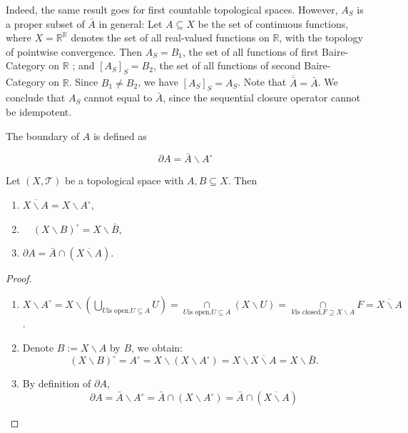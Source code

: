 Indeed, the same result goes for first countable topological spaces. However, \({A}_{S}\) is a proper subset of \(\bar{A}\) in general: Let \(A \subseteq  X\) be the set of continuous functions, where \(X = {\mathbb{R}}^{\mathbb{R}}\) denotes the set of all real-valued functions on \(\mathbb{R}\), with the topology of pointwise convergence. Then \({A}_{S} = B_1\), the set of all functions of first Baire-Category on \(\mathbb{R}\) ; and \({\left\lbrack  {A}_{S}\right\rbrack }_{S} = B_2\), the set of all functions of second Baire-Category on \(\mathbb{R}\). Since \(B_1 \neq  B_2\), we have \({\left\lbrack  {A}_{S}\right\rbrack }_{S} = {A}_{S}\). Note that \(\overline{\bar{A}} = \bar{A}\). We conclude that \({A}_{S}\) cannot equal to \(\bar{A}\), since the sequential closure operator cannot be idempotent.

\begin{definition}[Boundary] The boundary of \(A\) is defined as

\[
\partial A = \bar{A} \smallsetminus  {A}^{\circ}
\]
\end{definition}

\begin{proposition} Let $(X, \mathcal{T})$ be a topological space with \(A,B \subseteq  X\). Then
\begin{enumerate}
    \item $\overline{X \smallsetminus  A} = X \smallsetminus  {A}^{ \circ },$
    \item $\quad{\left(X \smallsetminus  B\right)}^{ \circ } = X \smallsetminus  \bar{B}$,
    \item $\partial A = \bar{A} \cap  \left(\overline{X \smallsetminus  A}\right)$.
\end{enumerate}
\end{proposition}
\begin{proof}
\begin{enumerate}
    \item \(
X \smallsetminus  {A}^{ \circ } = X \smallsetminus  \left({\mathop{\bigcup}\limits_{{U\text{is open,}U \subseteq  A}}U}\right)  
= \mathop{\cap}\limits_{{U\text{is open,}U \subseteq  A}}\left({X \smallsetminus  U}\right)  
= \mathop{\cap}\limits_{{V\text{is closed,}F \supseteq  X \smallsetminus  A}}F 
= \overline{X \smallsetminus  A}\).
\item Denote \(B := X \smallsetminus  A\) by \(B\), we obtain:
\[
{\left(X \smallsetminus  B\right)}^{ \circ } = {A}^{ \circ } 
= X \smallsetminus  \left({X \smallsetminus  {A}^{ \circ }}\right)
= X \smallsetminus  \overline{X \smallsetminus  A} 
= X \smallsetminus  \bar{B}.
\]
\item By definition of \(\partial A\),
\[
\partial A = \bar{A} \smallsetminus  {A}^{ \circ } 
= \bar{A}\cap \left({X \smallsetminus  {A}^{ \circ }}\right)
= \bar{A}\cap \left(\overline{X \smallsetminus  A}\right) 
\]
\end{enumerate}
\end{proof}

